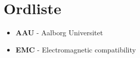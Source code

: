 \section*{Ordliste}
\begin{itemize}
\item \textbf{AAU} - Aalborg Universitet
\item \textbf{EMC} - Electromagnetic compatibility
\end{itemize}

\newpage